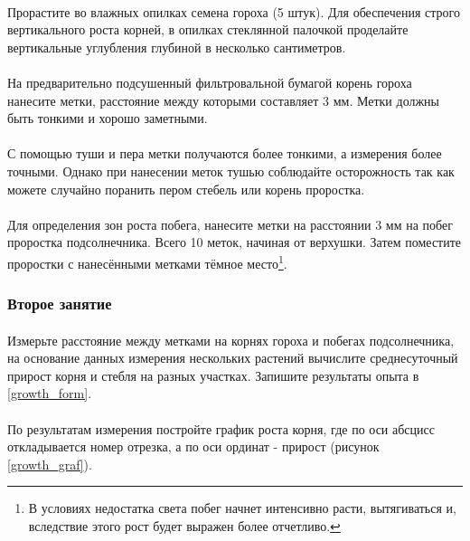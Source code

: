 	\paragraph*{}Прорастите во влажных опилках семена гороха (5 штук). Для обеспечения строго вертикального роста корней, в опилках стеклянной палочкой проделайте вертикальные углубления глубиной в несколько сантиметров. 
	
	\paragraph*{}На предварительно подсушенный фильтровальной бумагой корень гороха нанесите метки, расстояние между которыми составляет 3 мм. Метки должны быть тонкими и хорошо заметными. 
	
	\paragraph*{}\warningsign С помощью туши и пера метки получаются более тонкими, а измерения более точными. Однако при нанесении меток тушью соблюдайте осторожность так как можете случайно поранить пером стебель или корень проростка.
	
	\paragraph*{}Для определения зон роста побега, нанесите метки на расстоянии 3 мм на побег проростка подсолнечника. Всего 10 меток, начиная от верхушки. Затем поместите проростки с нанесёнными метками тёмное место\footnote{В условиях недостатка света побег начнет интенсивно расти, вытягиваться и, вследствие этого рост будет выражен более отчетливо.}.
	
	\subsubsection*{Второе занятие}
	
	\paragraph*{}Измерьте расстояние между метками на корнях гороха и побегах подсолнечника, на основание данных измерения нескольких растений вычислите среднесуточный прирост корня и стебля на разных участках. Запишите результаты опыта в \ref{growth_form}.
	
	\paragraph*{}По результатам измерения постройте график роста корня, где по оси абсцисс откладывается номер отрезка, а по оси ординат - прирост (рисунок \ref{growth_graf}). 
	
